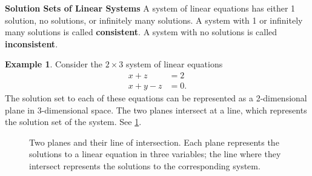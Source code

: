 \documentclass{article}
\theoremstyle{definition}
\newtheorem{example}{Example}
\newcounter{calloutbox}
\begin{document}
\begin{calloutbox}\label{box:solution-sets}
\textbf{Solution Sets of Linear Systems} A system of linear equations has either 1 solution, no solutions, or infinitely many solutions. A system with 1 or infinitely many solutions is called \textbf{consistent}. A system with no solutions is called \textbf{inconsistent}.
\end{calloutbox}

\begin{example}
    Consider the \(2 \times 3\) system of linear equations
    \begin{align*}
        x+z&=2 \\
        x+y-z&=0.
    \end{align*}
    The solution set to each of these equations can be represented as a 2-dimensional plane in 3-dimensional space. The two planes intersect at a line, which represents the solution set of the system. See \cref{fig:linear-system-2}.

\begin{figure}[H]
    \centering
    \caption{Two planes and their line of intersection. Each plane represents the solutions to a linear equation in three variables; the line where they intersect represents the solutions to the corresponding system.}
    \label{fig:linear-system-2}
\end{figure}
\end{example}
\end{document}
